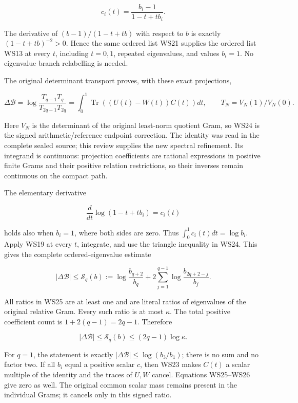 \[
c_i(t)=\frac{b_i-1}{1-t+tb_i}.
\tag{WS23}
\]

The derivative of \((b-1)/(1-t+tb)\) with respect to \(b\) is exactly \((1-t+tb)^{-2}>0\). Hence the same ordered list WS21 supplies the ordered list WS13 at every \(t\), including \(t=0,1\), repeated eigenvalues, and values \(b_i=1\). No eigenvalue branch relabelling is needed.

The original determinant transport proves, with these exact projections,

\[
\Delta\mathcal B
=\log\frac{T_{q-1}T_q}{T_{2q-1}T_{2q}}
=\int_0^1\operatorname{Tr}((U(t)-W(t))C(t))dt,
\qquad T_N=V_N(1)/V_N(0).
\tag{WS24}
\]

Here \(V_N\) is the determinant of the original least-norm quotient Gram, so WS24 is the signed arithmetic/reference endpoint correction. The identity was read in the complete sealed source; this review supplies the new spectral refinement. Its integrand is continuous: projection coefficients are rational expressions in positive finite Grams and their positive relation restrictions, so their inverses remain continuous on the compact path.

The elementary derivative

\[
\frac{d}{dt}\log(1-t+tb_i)=c_i(t)
\]

holds also when \(b_i=1\), where both sides are zero. Thus \(\int_0^1c_i(t)dt=\log b_i\). Apply WS19 at every \(t\), integrate, and use the triangle inequality in WS24. This gives the complete ordered-eigenvalue estimate

\[
\boxed{
|\Delta\mathcal B|
\le\mathscr S_q(b)
:=\log\frac{b_{q+2}}{b_q}
 +2\sum_{j=1}^{q-1}\log\frac{b_{2q+2-j}}{b_j}.
}
\tag{WS25}
\]

All ratios in WS25 are at least one and are literal ratios of eigenvalues of the original relative Gram. Every such ratio is at most \(\kappa\). The total positive coefficient count is \(1+2(q-1)=2q-1\). Therefore

\[
\boxed{\quad |\Delta\mathcal B|
\le\mathscr S_q(b)\le(2q-1)\log\kappa.\quad}
\tag{WS26}
\]

For \(q=1\), the statement is exactly \(|\Delta\mathcal B|\le\log(b_3/b_1)\); there is no sum and no factor two. If all \(b_i\) equal a positive scalar \(c\), then WS23 makes \(C(t)\) a scalar multiple of the identity and the traces of \(U,W\) cancel. Equations WS25--WS26 give zero as well. The original common scalar mass remains present in the individual Grams; it cancels only in this signed ratio.

